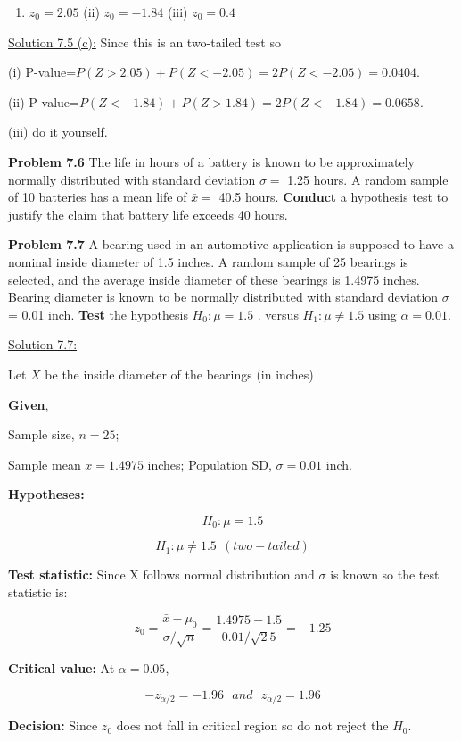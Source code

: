 \documentclass[
  11pt,
  letterpaper,
  DIV=11,
  numbers=noendperiod]{scrreprt}
\providecommand{\tightlist}{%
  \setlength{\itemsep}{0pt}\setlength{\parskip}{0pt}}
\begin{document}
\begin{enumerate}
\def\labelenumi{(\roman{enumi})}
\tightlist
\item
  \(z_0 = 2.05\) (ii) \(z_0 = - 1.84\) (iii) \(z_0 = 0.4\)
\end{enumerate}

\ul{Solution 7.5 (c):} Since this is an two-tailed test so

(i) P-value=\(P(Z>2.05)+P(Z<-2.05)=2P(Z<-2.05)=0.0404\).

(ii) P-value=\(P(Z<-1.84)+P(Z>1.84)=2P(Z<-1.84)=0.0658\).

(iii) do it yourself.

\textbf{Problem 7.6} The life in hours of a battery is known to be
approximately normally distributed with standard deviation \(\sigma=\)
1.25 hours. A random sample of 10 batteries has a mean life of
\(\bar x=\) 40.5 hours. \textbf{Conduct} a hypothesis test to justify
the claim that battery life exceeds 40 hours.

\textbf{Problem 7.7} A bearing used in an automotive application is
supposed to have a nominal inside diameter of 1.5 inches. A random
sample of 25 bearings is selected, and the average inside diameter of
these bearings is 1.4975 inches. Bearing diameter is known to be
normally distributed with standard deviation \(\sigma\) = 0.01 inch.
\textbf{Test} the hypothesis \(H_0:\mu = 1.5\) . versus
\(H_1:\mu \ne 1.5\) using \(\alpha = 0.01\).

\ul{Solution 7.7:}

Let \(X\) be the inside diameter of the bearings (in inches)

\textbf{Given},

Sample size, \(n=25\);

Sample mean \(\bar x =1.4975\) inches; Population SD, \(\sigma =0.01\)
inch.

\textbf{Hypotheses:}

\[H_0: \mu =1.5\]

\[H_1: \mu \ne 1.5 \ \ (two-tailed)\]

\textbf{Test statistic:} Since X follows normal distribution and
\(\sigma\) is known so the test statistic is:

\[z_0=\frac{\bar x-\mu_0}{\sigma/\sqrt n}=\frac{1.4975-1.5}{0.01/\sqrt 25}=-1.25\]

\textbf{Critical value:} At \(\alpha=0.05\),

\[-z_{\alpha/2}=- 1.96\ \ \ and \ \ \  z_{\alpha/2}=1.96\]

\textbf{Decision:} Since \(z_0\) does not fall in critical region so do
not reject the \(H_0\).
\end{document}
